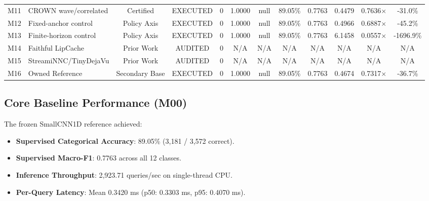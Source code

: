 \documentclass[10pt,twocolumn]{article}
\begin{document}
\begin{table}[t]
{\begin{tabular}{llcccccccccc}
M11 & CROWN wave/correlated & Certified & EXECUTED & 0 & 1.0000 & null & 89.05\% & 0.7763 & 0.4479 & 0.7636$\times$ & -31.0\% \\
M12 & Fixed-anchor control & Policy Axis & EXECUTED & 0 & 1.0000 & null & 89.05\% & 0.7763 & 0.4966 & 0.6887$\times$ & -45.2\% \\
M13 & Finite-horizon control & Policy Axis & EXECUTED & 0 & 1.0000 & null & 89.05\% & 0.7763 & 6.1458 & 0.0557$\times$ & -1696.9\% \\
M14 & Faithful LipCache & Prior Work & AUDITED & 0 & N/A & N/A & N/A & N/A & N/A & N/A & N/A \\
M15 & StreamiNNC/TinyDejaVu & Prior Work & AUDITED & 0 & N/A & N/A & N/A & N/A & N/A & N/A & N/A \\
M16 & Owned Reference & Secondary Base & EXECUTED & 0 & 1.0000 & null & 89.05\% & 0.7763 & 0.4674 & 0.7317$\times$ & -36.7\% \\
\bottomrule
\end{tabular}%
}
\end{table}

\subsection{Core Baseline Performance (M00)}
The frozen SmallCNN1D reference achieved:
\begin{itemize}
    \item \textbf{Supervised Categorical Accuracy}: 89.05\% (3,181 / 3,572 correct).
    \item \textbf{Supervised Macro-F1}: 0.7763 across all 12 classes.
    \item \textbf{Inference Throughput}: 2,923.71 queries/sec on single-thread CPU.
    \item \textbf{Per-Query Latency}: Mean 0.3420 ms (p50: 0.3303 ms, p95: 0.4070 ms).
\end{itemize}
\end{document}
